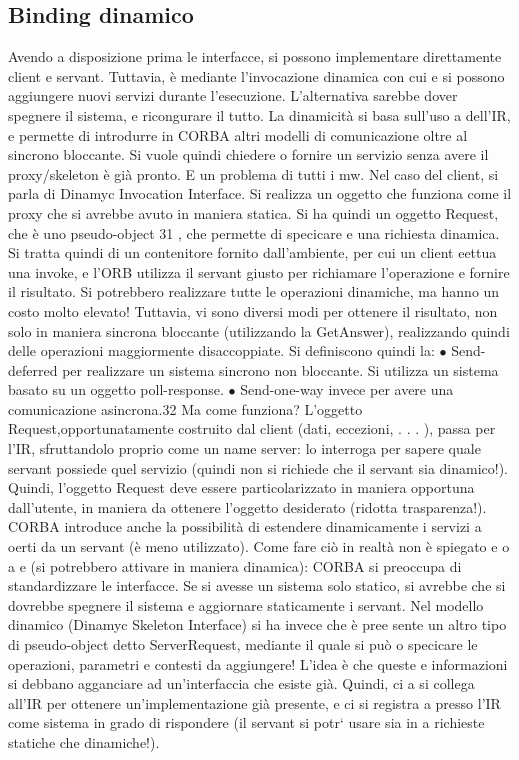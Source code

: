 \subsection{Binding dinamico}
Avendo a disposizione prima le interfacce, si possono implementare direttamente client e servant. Tuttavia, è mediante
l'invocazione dinamica con cui
e
si possono aggiungere nuovi servizi durante l'esecuzione. L'alternativa sarebbe
dover spegnere il sistema, e ricongurare il tutto. La dinamicità si basa sull'uso
a
dell'IR, e permette di introdurre in CORBA altri modelli di comunicazione oltre
al sincrono bloccante.
Si vuole quindi chiedere o fornire un servizio senza avere il proxy/skeleton è già pronto. E un problema di tutti i mw.
Nel caso del client, si parla di Dinamyc Invocation Interface. Si realizza un oggetto che funziona come il proxy che si
avrebbe avuto in maniera statica. Si ha quindi un oggetto Request, che è uno pseudo-object 31 , che permette di
specicare e una richiesta dinamica. Si tratta quindi di un contenitore fornito dall'ambiente,
per cui un client eettua una invoke, e l'ORB utilizza il servant giusto per
richiamare l'operazione e fornire il risultato. Si potrebbero realizzare tutte le
operazioni dinamiche, ma hanno un costo molto elevato! Tuttavia, vi sono
diversi modi per ottenere il risultato, non solo in maniera sincrona bloccante
(utilizzando la GetAnswer), realizzando quindi delle operazioni maggiormente
disaccoppiate. Si definiscono quindi la:
$\bullet$ Send-deferred per realizzare un sistema sincrono non bloccante. Si utilizza
un sistema basato su un oggetto poll-response.
$\bullet$ Send-one-way invece per avere una comunicazione asincrona.32
Ma come funziona? L'oggetto Request,opportunatamente costruito dal client
(dati, eccezioni, . . . ), passa per l'IR, sfruttandolo proprio come un name server: lo interroga per sapere quale
servant possiede quel servizio (quindi non si
richiede che il servant sia dinamico!). Quindi, l'oggetto Request deve essere particolarizzato in maniera opportuna
dall'utente, in maniera da ottenere l'oggetto
desiderato (ridotta trasparenza!).
CORBA introduce anche la possibilità di estendere dinamicamente i servizi
a
oerti da un servant (è meno utilizzato). Come fare ciò in realtà non è spiegato
e
o
a
e
(si potrebbero attivare in maniera dinamica): CORBA si preoccupa di standardizzare le interfacce. Se si avesse un
sistema solo statico, si avrebbe che si
dovrebbe spegnere il sistema e aggiornare staticamente i servant.
Nel modello dinamico (Dinamyc Skeleton Interface) si ha invece che è pree
sente un altro tipo di pseudo-object detto ServerRequest, mediante il quale si può
o
specicare le operazioni, parametri e contesti da aggiungere! L'idea è che queste
e
informazioni si debbano agganciare ad un'interfaccia che esiste già. Quindi, ci
a
si collega all'IR per ottenere un'implementazione già presente, e ci si registra
a
presso l'IR come sistema in grado di rispondere (il servant si potr` usare sia in
a
richieste statiche che dinamiche!).
